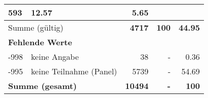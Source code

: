 \begin{longtable}{lXrrr}
       \num{593} &
       \num[round-mode=places,round-precision=2]{12.57} &
         \num[round-mode=places,round-precision=2]{5.65} \\
     \midrule
     \multicolumn{2}{l}{Summe (gültig)} &
       \textbf{\num{4717}} &
     \textbf{\num{100}} &
       \textbf{\num[round-mode=places,round-precision=2]{44.95}} \\
     \multicolumn{5}{l}{\textbf{Fehlende Werte}}\\
       -998 &
       keine Angabe &
         \num{38} &
        - &
         \num[round-mode=places,round-precision=2]{0.36} \\
       -995 &
       keine Teilnahme (Panel) &
         \num{5739} &
        - &
         \num[round-mode=places,round-precision=2]{54.69} \\
     \midrule
     \multicolumn{2}{l}{\textbf{Summe (gesamt)}} &
          \textbf{\num{10494}} &
        \textbf{-} &
        \textbf{\num{100}} \\
     \bottomrule
     \end{longtable}
     
